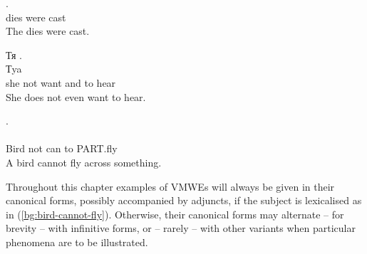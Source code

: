 \documentclass[output=paper,
modfonts,
]{langscibook}
\begin{document}
\ea \label{pl:kosci-zostaly-rzucone}
\settowidth {} 
\gll {}  .\\
dies were cast \\ 
\glt The dies were cast. 
\z

\ea \label{bg:not-want-hear}
\settowidth {} 
\glll Тя     . \\
Тya      \\
she  not want and to hear \\ 
\glt She does not even want to hear. 
\z

\ea \label{bg:bird-cannot-fly}
\settowidth {} 
\glll {}    .\\
     \\
{Bird} {not} {can} {to} {\textsc{PART}.fly} \\ 
\glt A bird cannot fly across something. 
\z

Throughout this chapter examples of VMWEs will always be given in their canonical forms, possibly accompanied by adjuncts, if the subject is lexicalised as in (\ref{bg:bird-cannot-fly}).
Otherwise, their canonical forms may alternate -- for brevity -- with infinitive forms, or -- rarely -- with other variants when particular phenomena are to be illustrated.


\end{document}
